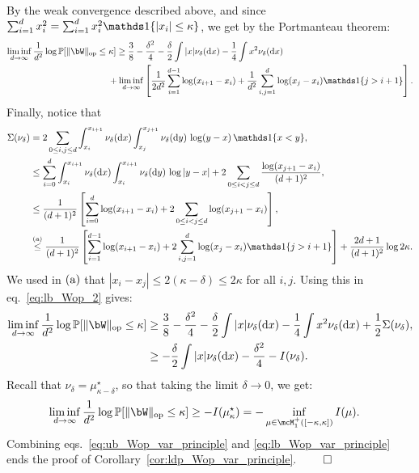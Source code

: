 By the weak convergence described above, and since $\sum_{i=1}^d x_i^2 = \sum_{i=1}^d x_i^2 \indi\{|x_i| \leq \kappa\}$, we get by the Portmanteau theorem:
\begin{align}\label{eq:lb_Wop_2}
    \liminf_{d \to \infty} \frac{1}{d^2} \log \bbP[\|\bW\|_\op \leq \kappa]  
    &\geq \frac{3}{8} - \frac{\delta^2}{4} - \frac{\delta}{2} \int |x| \nu_\delta(\rd x) - \frac{1}{4} \int x^2 \nu_\delta(\rd x) \\
    \nonumber
    &\hspace{-9pt}+ \liminf_{d \to \infty}\left[\frac{1}{2d^2} \sum_{i=1}^{d-1} \log (x_{i+1} - x_i) + \frac{1}{d^2} \sum_{i,j=1}^d \log(x_j - x_i) \indi\{j > i+1\}
    \right].
\end{align}
Finally, notice that 
\begin{align*}
    \Sigma(\nu_\delta) &= 2 \sum_{0 \leq i,j \leq d} \int_{x_i}^{x_{i+1}} \nu_\delta(\rd x) \int_{x_j}^{x_{j+1}} \nu_\delta(\rd y) \, \log (y-x) \, \indi\{x < y\}, \\ 
    &\leq \sum_{i=0}^d \int_{x_i}^{x_{i+1}} \nu_\delta(\rd x) \int_{x_i}^{x_{i+1}} \nu_\delta(\rd y) \, \log |y-x| + 2 \sum_{0 \leq i < j \leq d} \frac{\log(x_{j+1} - x_i)}{(d+1)^2}, \\
    &\leq \frac{1}{(d+1)^2} \left[\sum_{i=0}^d \log(x_{i+1}-x_i) + 2 \sum_{0 \leq i < j \leq d} \log(x_{j+1} - x_i)\right], \\ 
    &\aleq \frac{1}{(d+1)^2} \left[\sum_{i=1}^{d-1} \log(x_{i+1}-x_i) + 2 \sum_{i,j=1}^d \log(x_j - x_i) \indi\{j > i+1\} \right] + \frac{2d+1}{(d+1)^2} \log 2 \kappa.
\end{align*}
We used in $(\rm a)$ that $|x_i - x_j| \leq 2 (\kappa-\delta) \leq 2\kappa$ for all $i,j$.
Using this in eq.~\eqref{eq:lb_Wop_2} gives:
\begin{align*}
    \liminf_{d \to \infty} \frac{1}{d^2} \log \bbP[\|\bW\|_\op \leq \kappa]  
    &\geq \frac{3}{8} - \frac{\delta^2}{4} - \frac{\delta}{2} \int |x| \nu_\delta(\rd x) - \frac{1}{4} \int x^2 \nu_\delta(\rd x) + \frac{1}{2} \Sigma(\nu_\delta), \\
    &\geq - \frac{\delta}{2} \int |x| \nu_\delta(\rd x)  - \frac{\delta^2}{4} - I(\nu_\delta).
\end{align*}
Recall that $\nu_\delta = \mu^\star_{\kappa - \delta}$, so that taking the limit $\delta \to 0$, we get:
\begin{align}\label{eq:lb_Wop_var_principle}
    \liminf_{d \to \infty} \frac{1}{d^2} \log\bbP[\|\bW\|_\op \leq \kappa] 
    &\geq - I(\mu_\kappa^\star) = - \inf_{\mu \in \mcM_1^+([-\kappa,\kappa])} I(\mu).
\end{align}
Combining eqs.~\eqref{eq:ub_Wop_var_principle} and \eqref{eq:lb_Wop_var_principle} ends the proof of Corollary~\ref{cor:ldp_Wop_var_principle}.
$\qed$
